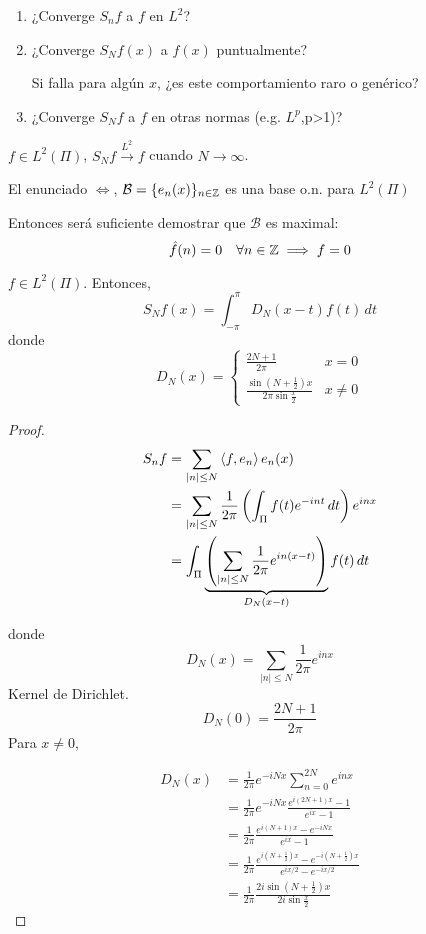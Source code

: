 \begin{enumerate}
    \item ¿Converge $S_n f$ a $f$ en $L^2$?
    \item ¿Converge $S_N f(x)$ a $f(x)$ puntualmente?
    
    Si falla para algún $x$, ¿es este comportamiento raro o genérico?

    \item ¿Converge $S_N f$ a $f$ en otras normas (e.g. $L^p$,p>1)?
\end{enumerate}

\begin{ftheorem}
    $f\in L^2(\Pi)$, $S_N f\xrightarrow{L^2}f$ cuando $N\to\infty$.
\end{ftheorem}

\begin{fnote}
    El enunciado $\iff$,  $\mathcal{B}=\{e_n(x)\}_{n\in\mathbb{Z}}$ es una base o.n. para $L^2(\Pi)$
\end{fnote}

    Entonces será suficiente demostrar que $\mathcal{B}$ es maximal:
    \[\hat f(n)=0\quad\forall n\in\mathbb{Z}\implies f=0\]


\begin{ftheorem}
    $f\in L^2(\Pi)$. Entonces, 
    \[S_N f(x)=\int_{-\pi}^\pi D_N(x-t)f(t)\,dt\]
    donde 
    \[D_N(x)=\begin{cases}
        \frac{2N+1}{2\pi}& x=0\\
        \frac{\sin(N+\frac{1}{2})x}{2\pi\sin \frac{x}{2}}&x\neq 0
    \end{cases}\]
\end{ftheorem}

\begin{proof}
    \begin{align*}
        S_n f&=\sum_{|n|\leq N}\left\langle f,e_n\right\rangle e_n(x)\\
        &=\sum_{|n|\leq N} \frac{1}{2\pi}\left( \int_{\Pi} f(t)e^{-int}\,dt\right) e^{inx}\\
        &=\int_{\Pi} \underbrace{\left(\sum_{|n|\leq N} \frac{1}{2\pi} e^{in(x-t)}\right)}_{D_N(x-t)}f(t)\,dt
    \end{align*}

    donde 
    \[D_N(x)=\sum_{|n|\leq N} \frac{1}{2\pi} e^{inx}\]
    Kernel de Dirichlet.
    \[D_N(0)=\frac{2N+1}{2\pi}\]
    Para $x\neq 0$,

    \begin{align*}
        D_N(x)&=\frac{1}{2\pi} e^{-iNx} \sum_{n=0}^{2N} e^{inx}\\
        &=\frac{1}{2\pi} e^{-iNx} \frac{e^{i(2N+1)x}-1}{e^{ix}-1}\\
        &=\frac{1}{2\pi} \frac{e^{i(N+1)x}-e^{-iNx}}{e^{ix}-1}\\
        &=\frac{1}{2\pi}\frac{e^{i(N+\frac{1}{2})x}-e^{-i(N+\frac{1}{2})x}}{e^{ix/2}-e^{-ix/2}}\\
        &=\frac{1}{2\pi}\frac{2i \sin(N+\frac{1}{2})x}{2i \sin \frac{x}{2}}
    \end{align*}
\end{proof}

